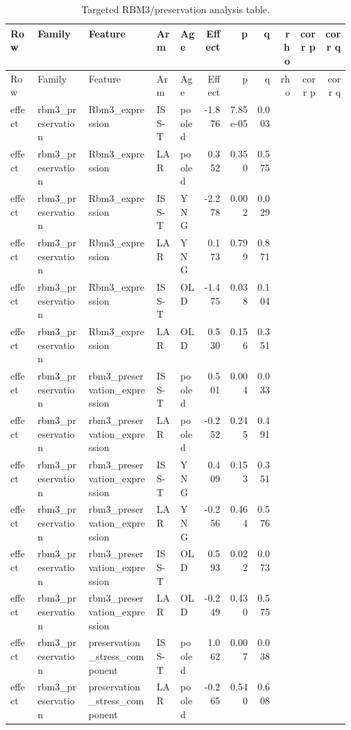 \documentclass[11pt]{article}
\begin{document}
\begin{landscape}
\scriptsize
\setlength{\tabcolsep}{3pt}
\begin{longtable}{p{0.08\linewidth}p{0.15\linewidth}p{0.20\linewidth}p{0.07\linewidth}p{0.07\linewidth}rrrrrr}
\caption{Targeted RBM3/preservation analysis table.}\\
\toprule
Row & Family & Feature & Arm & Age & Effect & p & q & rho & corr p & corr q \\
\midrule
\endfirsthead
\toprule
Row & Family & Feature & Arm & Age & Effect & p & q & rho & corr p & corr q \\
\midrule
\endhead
effect & rbm3\_preservation & Rbm3\_expression & ISS-T & pooled & -1.876 & 7.85e-05 & 0.003 &  &  &  \\
effect & rbm3\_preservation & Rbm3\_expression & LAR & pooled & 0.352 & 0.350 & 0.575 &  &  &  \\
effect & rbm3\_preservation & Rbm3\_expression & ISS-T & YNG & -2.278 & 0.002 & 0.029 &  &  &  \\
effect & rbm3\_preservation & Rbm3\_expression & LAR & YNG & 0.173 & 0.799 & 0.871 &  &  &  \\
effect & rbm3\_preservation & Rbm3\_expression & ISS-T & OLD & -1.475 & 0.038 & 0.104 &  &  &  \\
effect & rbm3\_preservation & Rbm3\_expression & LAR & OLD & 0.530 & 0.156 & 0.351 &  &  &  \\
effect & rbm3\_preservation & rbm3\_preservation\_expression & ISS-T & pooled & 0.501 & 0.004 & 0.033 &  &  &  \\
effect & rbm3\_preservation & rbm3\_preservation\_expression & LAR & pooled & -0.252 & 0.245 & 0.491 &  &  &  \\
effect & rbm3\_preservation & rbm3\_preservation\_expression & ISS-T & YNG & 0.409 & 0.153 & 0.351 &  &  &  \\
effect & rbm3\_preservation & rbm3\_preservation\_expression & LAR & YNG & -0.256 & 0.464 & 0.576 &  &  &  \\
effect & rbm3\_preservation & rbm3\_preservation\_expression & ISS-T & OLD & 0.593 & 0.022 & 0.073 &  &  &  \\
effect & rbm3\_preservation & rbm3\_preservation\_expression & LAR & OLD & -0.249 & 0.430 & 0.575 &  &  &  \\
effect & rbm3\_preservation & preservation\_stress\_component & ISS-T & pooled & 1.062 & 0.007 & 0.038 &  &  &  \\
effect & rbm3\_preservation & preservation\_stress\_component & LAR & pooled & -0.265 & 0.540 & 0.608 &  &  &  \\

\end{longtable}
\end{landscape}
\end{document}
